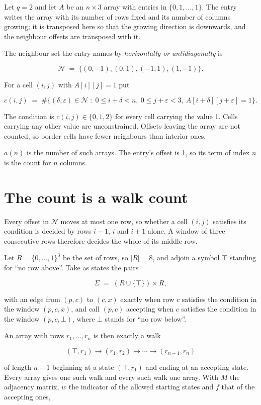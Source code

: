 \documentclass[11pt]{article}
\theoremstyle{definition}
\begin{document}
Let $q = 2$ and let $A$ be an $n \times 3$ array with entries in $\{0,1,\dots,1\}$. The entry writes the array with its number of rows fixed and its number of columns growing; it is transposed here so that the growing direction is downwards, and the neighbour offsets are transposed with it.

The neighbour set the entry names by {\itshape horizontally or antidiagonally} is

\[\mathcal{N} \;=\; \{(0,-1), (0,1), (-1,1), (1,-1)\}.\]

For a cell $(i,j)$ with $A[i][j] = 1$ put

\[c(i,j) \;=\; \#\bigl\{(\delta,\varepsilon)\in\mathcal{N} \;:\; 0\le i+\delta<n,\ 0\le j+\varepsilon<3,\ A[i+\delta][j+\varepsilon] = 1\bigr\}.\]

The condition is $c(i,j) \in \{0, 1, 2\}$ for every cell carrying the value 1. Cells carrying any other value are unconstrained. Offsets leaving the array are not counted, so border cells have fewer neighbours than interior ones.

$a(n)$ is the number of such arrays. The entry's offset is 1, so its term of index $n$ is the count for $n$ columns.

\section{The count is a walk count}

Every offset in $\mathcal{N}$ moves at most one row, so whether a cell $(i,j)$ satisfies its condition is decided by rows $i-1$, $i$ and $i+1$ alone. A window of three consecutive rows therefore decides the whole of its middle row.

Let $R = \{0,\dots,1\}^{3}$ be the set of rows, so $|R| = 8$, and adjoin a symbol $\top$ standing for ``no row above''. Take as states the pairs

\[\Sigma \;=\; (R \cup \{\top\}) \times R,\]

with an edge from $(p,c)$ to $(c,x)$ exactly when row $c$ satisfies the condition in the window $(p,c,x)$, and call $(p,c)$ accepting when $c$ satisfies the condition in the window $(p,c,\bot)$, where $\bot$ stands for ``no row below''.

An array with rows $r_1,\dots,r_n$ is then exactly a walk

\[(\top,r_1) \to (r_1,r_2) \to \cdots \to (r_{n-1},r_n)\]

of length $n-1$ beginning at a state $(\top,r_1)$ and ending at an accepting state. Every array gives one such walk and every such walk one array. With $M$ the adjacency matrix, $w$ the indicator of the allowed starting states and $f$ that of the accepting ones,
\end{document}
